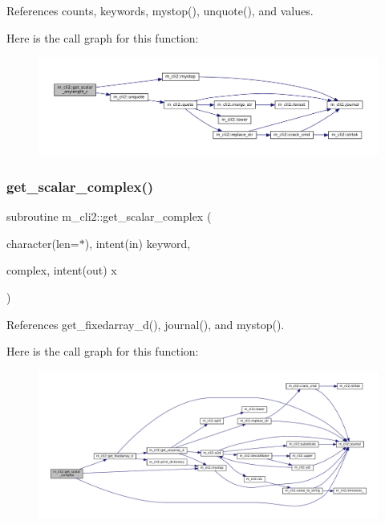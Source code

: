 References counts, keywords, mystop(), unquote(), and values.

Here is the call graph for this function\+:
\nopagebreak
\begin{figure}[H]
\begin{center}
\leavevmode
\includegraphics[width=350pt]{namespacem__cli2_a7429381c83a021ba3ffb32ed58e17a0e_cgraph}
\end{center}
\end{figure}
\mbox{\label{namespacem__cli2_a2af4dd786acb5cb2dbd6e43667109490}} 
\subsubsection{\texorpdfstring{get\+\_\+scalar\+\_\+complex()}{get\_scalar\_complex()}}
{\footnotesize\ttfamily subroutine m\+\_\+cli2\+::get\+\_\+scalar\+\_\+complex (\begin{DoxyParamCaption}\item[{character(len=$\ast$), intent(in)}]{keyword,  }\item[{complex, intent(out)}]{x }\end{DoxyParamCaption})\hspace{0.3cm}{\ttfamily [private]}}



References get\+\_\+fixedarray\+\_\+d(), journal(), and mystop().

Here is the call graph for this function\+:
\nopagebreak
\begin{figure}[H]
\begin{center}
\leavevmode
\includegraphics[width=350pt]{namespacem__cli2_a2af4dd786acb5cb2dbd6e43667109490_cgraph}
\end{center}
\end{figure}
\mbox{\label{namespacem__cli2_a338757660adde093db76b7d5559a1906}} 
